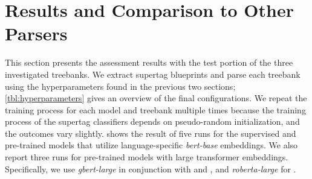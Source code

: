 \documentclass[../../document.tex]{subfiles}
\begin{document}
    \section{Results and Comparison to Other Parsers}\label{sec:results}
    This section presents the assessment results with the test portion of the three investigated treebanks.
    We extract supertag blueprints and parse each treebank using the hyperparameters found in the previous two sections; \cref{tbl:hyperparameters} gives an overview of the final configurations.
    We repeat the training process for each model and treebank multiple times because the training process of the supertag classifiers depends on pseudo-random initialization, and the outcomes vary slightly.
     shows the result of five runs for the supervised and pre-trained models that utilize language-specific \emph{bert-base} embeddings.
    We also report three runs for pre-trained models with large transformer embeddings.
    Specifically, we use \emph{gbert-large} \citep{Cha20} in conjunction with \negra{} and \tiger{}, and \emph{roberta-large} \citep{roberta} for \dptb{}.
\end{document}
